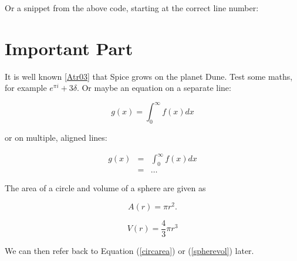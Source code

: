 \documentclass[letterpaper,compsoc,twoside,onecolumn]{IEEEtran}
\begin{document}
Or a snippet from the above code, starting at the correct line number:

\begin{Shaded}
\begin{Highlighting}[]
 \OperatorTok{(}\OperatorTok{=} \OperatorTok{;}\OperatorTok{\textless{}} \OperatorTok{;}\OperatorTok{++)} \OperatorTok{\{}
\OperatorTok{\}}
\end{Highlighting}
\end{Shaded}

\hypertarget{important-part}{%
\section{Important Part}\label{important-part}}

It is well known \protect\hyperlink{Atr03}{{[}Atr03{]}} that Spice grows
on the planet Dune. Test some maths, for example
$e^{\pi i} + 3 \delta$. Or maybe an equation on a separate line:

\begin{equation}
g(x) = \int_0^\infty f(x) dx
\end{equation}

or on multiple, aligned lines:

\begin{equation}
  \begin{aligned}
g(x) &=& \int_0^\infty f(x) dx \\
     &=& \ldots
\end{aligned}
\end{equation}

The area of a circle and volume of a sphere are given as

\begin{equation}
  A(r) = \pi r^2.
  \label{circarea}
\end{equation}

\begin{equation}
  V(r) = \frac{4}{3} \pi r^3
  \label{spherevol}
\end{equation}

We can then refer back to Equation (\ref{circarea}) or (\ref{spherevol}) later.
\end{document}
